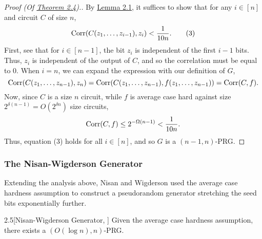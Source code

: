 \documentclass[11pt]{article}
\begin{document}
\begin{proof}[Proof \textup{(Of \hyperref[t-2-4]{Theorem 2.4})}.]
    By \hyperref[l-2-1]{Lemma 2.1}, it suffices to show that for any $i \in [n]$ and circuit $C$ of size $n$, 
    \begin{equation*}
        \mathrm{Corr}(C(z_1, \ldots, z_{i - 1}), z_i) < \frac{1}{10 n}. \tag{3}
    \end{equation*}
    First, see that for $i \in [n - 1]$, the bit $z_i$ is independent of the first $i - 1$ bits. Thus, $z_i$ is independent of the output of $C$, and so the correlation must be equal to $0$. When $i = n$, we can expand the expression with our definition of $G$,
    \begin{equation*}
        \mathrm{Corr}(C(z_1, \ldots, z_{n - 1}), z_n) = \mathrm{Corr}(C(z_1, \ldots, z_{n - 1}), f(z_1, \ldots, z_{n - 1})) = \mathrm{Corr}(C, f).
    \end{equation*}
    Now, since $C$ is a size $n$ circuit, while $f$ is average case hard against size $2^{\delta (n - 1)} = O(2^{\delta n})$ size circuits,
    \begin{equation*}
        \mathrm{Corr}(C, f) \leq 2^{-\Omega(n - 1)} < \frac{1}{10 n}.
    \end{equation*}
    Thus, equation (3) holds for all $i \in [n]$, and so $G$ is a $(n - 1, n)$-PRG.
\end{proof}

\subsubsection{The Nisan-Wigderson Generator}

Extending the analysis above, Nisan and Wigderson \cite{NW94} used the average case hardness assumption to construct a pseudorandom generator stretching the seed bits exponentially further.

\begin{theorem}{2.5}[Nisan-Wigderson Generator, \cite{NW94}]
    Given the average case hardness assumption, there exists a $(O(\log n), n)$-PRG.
\end{theorem}
\end{document}
